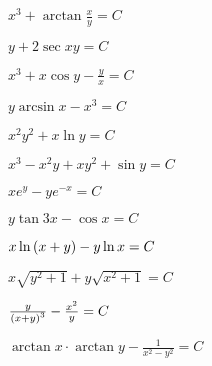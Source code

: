 \begin{enumsols}
		\item \( x^3 + \arctan{\frac{x}{y}} = C \) %
		\item \( y + 2\sec{xy} = C \) %
		\item \( x^3 + x \cos{y} - \frac{y}{x} = C \) %
		\item \( y \arcsin{x} - x^3 = C \) %
		\item \( x^2 y^2 + x \ln{y} = C \) %
		\item \( x^3 - x^2 y + xy^2 + \sin{y} = C \) %
		\item \( xe^{y} - ye^{-x} = C \) %
		\item \( y \tan{3x} - \cos{x} = C \) %
		\item \( x \ln\left( x + y \right) - y \ln{x} = C \) %
		\item \( x \sqrt{y^2 + 1} + y \sqrt{x^2 + 1} = C \) %
		\item \( \frac{y}{\left( x + y \right)^3} - \frac{x^2}{y} = C \) %
		\item \( \arctan{x} \cdot \arctan{y} - \frac{1}{x^2 - y^2} = C \) %
	
	\end{enumsols}
